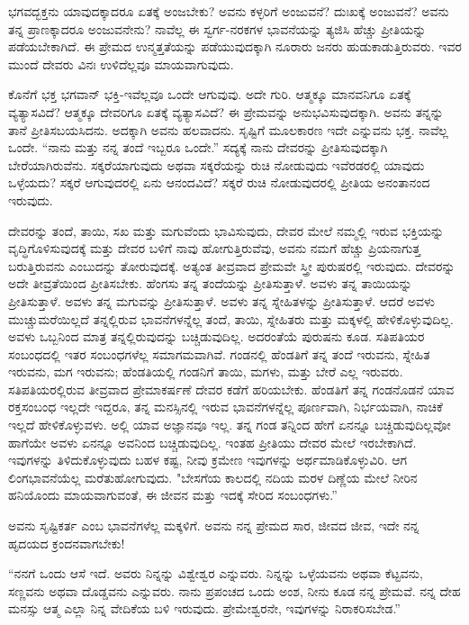 ಭಗವದ್ಭಕ್ತನು ಯಾವುದಕ್ಕಾದರೂ ಏತಕ್ಕೆ ಅಂಜಬೇಕು? ಅವನು ಕಳ್ಳರಿಗೆ ಅಂಜುವನೆ? ದುಃಖಕ್ಕೆ ಅಂಜುವನೆ? ಅವನು ತನ್ನ ಪ್ರಾಣಕ್ಕಾದರೂ ಅಂಜುವನೇನು? ನಾವೆಲ್ಲ ಈ ಸ್ವರ್ಗ-ನರಕಗಳ ಭಾವನೆಯನ್ನು ತ್ಯಜಿಸಿ ಹೆಚ್ಚು ಪ್ರೀತಿಯನ್ನು ಪಡೆಯಬೇಕಾಗಿದೆ. ಈ ಪ್ರೇಮದ ಉನ್ಮತ್ತತೆಯನ್ನು ಪಡೆಯುವುದಕ್ಕಾಗಿ ನೂರಾರು ಜನರು ಹುಡುಕಾಡುತ್ತಿರುವರು. ಇವರ ಮುಂದೆ ದೇವರು ವಿನಃ ಉಳಿದೆಲ್ಲವೂ ಮಾಯವಾಗುವುದು.

ಕೊನೆಗೆ ಭಕ್ತ ಭಗವಾನ್ ಭಕ್ತಿ-ಇವೆಲ್ಲವೂ ಒಂದೇ ಆಗುವುವು. ಅದೇ ಗುರಿ. ಆತ್ಮಕ್ಕೂ ಮಾನವನಿಗೂ ಏತಕ್ಕೆ ವ್ಯತ್ಯಾಸವಿದೆ? ಆತ್ಮಕ್ಕೂ ದೇವರಿಗೂ ಏತಕ್ಕೆ ವ್ಯತ್ಯಾಸವಿದೆ? ಈ ಪ್ರೇಮವನ್ನು ಅನುಭವಿಸುವುದಕ್ಕಾಗಿ. ಅವನು ತನ್ನನ್ನು ತಾನೆ ಪ್ರೀತಿಸಬಯಸಿದನು. ಅದಕ್ಕಾಗಿ ಅವನು ಹಲವಾದನು. ಸೃಷ್ಟಿಗೆ ಮೂಲಕಾರಣ ಇದೇ ಎನ್ನುವನು ಭಕ್ತ. ನಾವೆಲ್ಲ ಒಂದೇ. “ನಾನು ಮತ್ತು ನನ್ನ ತಂದೆ ಇಬ್ಬರೂ ಒಂದೇ.” ಸದ್ಯಕ್ಕೆ ನಾನು ದೇವರನ್ನು ಪ್ರೀತಿಸುವುದಕ್ಕಾಗಿ ಬೇರೆಯಾಗಿರುವೆನು. ಸಕ್ಕರೆಯಾಗುವುದು ಅಥವಾ ಸಕ್ಕರೆಯನ್ನು ರುಚಿ ನೋಡುವುದು ಇವೆರಡರಲ್ಲಿ ಯಾವುದು ಒಳ್ಳೆಯದು? ಸಕ್ಕರೆ ಆಗುವುದರಲ್ಲಿ ಏನು ಆನಂದವಿದೆ? ಸಕ್ಕರೆ ರುಚಿ ನೋಡುವುದರಲ್ಲಿ ಪ್ರೀತಿಯ ಅನಂತಾನಂದ ಇರುವುದು.

ದೇವರನ್ನು ತಂದೆ, ತಾಯಿ, ಸಖ ಮತ್ತು ಮಗುವೆಂದು ಭಾವಿಸುವುದು, ದೇವರ ಮೇಲೆ ನಮ್ಮಲ್ಲಿ ಇರುವ ಭಕ್ತಿಯನ್ನು ವೃದ್ಧಿಗೊಳಿಸುವುದಕ್ಕೆ ಮತ್ತು ದೇವರ ಬಳಿಗೆ ನಾವು ಹೋಗುತ್ತಿರುವೆವು, ಅವನು ನಮಗೆ ಹೆಚ್ಚು ಪ್ರಿಯನಾಗುತ್ತ ಬರುತ್ತಿರುವನು ಎಂಬುದನ್ನು ತೋರುವುದಕ್ಕೆ. ಅತ್ಯಂತ ತೀವ್ರವಾದ ಪ್ರೇಮವೇ ಸ್ತ್ರೀ ಪುರುಷರಲ್ಲಿ ಇರುವುದು. ದೇವರನ್ನು ಅದೇ ತೀವ್ರತೆಯಿಂದ ಪ್ರೀತಿಸಬೇಕು. ಹೆಂಗಸು ತನ್ನ ತಂದೆಯನ್ನು ಪ್ರೀತಿಸುತ್ತಾಳೆ. ಅವಳು ತನ್ನ ತಾಯಿಯನ್ನು ಪ್ರೀತಿಸುತ್ತಾಳೆ. ಅವಳು ತನ್ನ ಮಗುವನ್ನು ಪ್ರೀತಿಸುತ್ತಾಳೆ. ಅವಳು ತನ್ನ ಸ್ನೇಹಿತಳನ್ನು ಪ್ರೀತಿಸುತ್ತಾಳೆ. ಆದರೆ ಅವಳು ಮುಚ್ಚುಮರೆಯಿಲ್ಲದೆ ತನ್ನಲ್ಲಿರುವ ಭಾವನೆಗಳನ್ನೆಲ್ಲ ತಂದೆ, ತಾಯಿ, ಸ್ನೇಹಿತರು ಮತ್ತು ಮಕ್ಕಳಲ್ಲಿ ಹೇಳಿಕೊಳ್ಳುವುದಿಲ್ಲ. ಅವಳು ಒಬ್ಬನಿಂದ ಮಾತ್ರ ತನ್ನಲ್ಲಿರುವುದನ್ನು ಬಚ್ಚಿಡುವುದಿಲ್ಲ. ಅದರಂತೆಯೆ ಪುರುಷನು ಕೂಡ. ಸತಿಪತಿಯರ ಸಂಬಂಧದಲ್ಲಿ ಇತರ ಸಂಬಂಧಗಳೆಲ್ಲ ಸಮಾಗಮವಾಗಿವೆ. ಗಂಡನಲ್ಲಿ ಹೆಂಡತಿಗೆ ತನ್ನ ತಂದೆ ಇರುವನು, ಸ್ನೇಹಿತ ಇರುವನು, ಮಗ ಇರುವನು; ಹೆಂಡತಿಯಲ್ಲಿ ಗಂಡನಿಗೆ ತಾಯಿ, ಮಗಳು, ಮತ್ತು ಬೇರೆ ಎಲ್ಲ ಇರುವರು. ಸತಿಪತಿಯರಲ್ಲಿರುವ ತೀವ್ರವಾದ ಪ್ರೇಮಾಕರ್ಷಣೆ ದೇವರ ಕಡೆಗೆ ಹರಿಯಬೇಕು. ಹೆಂಡತಿಗೆ ತನ್ನ ಗಂಡನೊಡನೆ ಯಾವ ರಕ್ತಸಂಬಂಧ ಇಲ್ಲದೇ ಇದ್ದರೂ, ತನ್ನ ಮನಸ್ಸಿನಲ್ಲಿ ಇರುವ ಭಾವನೆಗಳನ್ನೆಲ್ಲ ಪೂರ್ಣವಾಗಿ, ನಿರ್ಭಯವಾಗಿ, ನಾಚಿಕೆ ಇಲ್ಲದೆ ಹೇಳಿಕೊಳ್ಳುವಳು. ಅಲ್ಲಿ ಯಾವ ಅಜ್ಞಾನವೂ ಇಲ್ಲ. ತನ್ನ ಗಂಡ ತನ್ನಿಂದ ಹೇಗೆ ಏನನ್ನೂ ಬಚ್ಚಿಡುವುದಿಲ್ಲವೋ ಹಾಗೆಯೇ ಅವಳು ಏನನ್ನೂ ಅವನಿಂದ ಬಚ್ಚಿಡುವುದಿಲ್ಲ. ಇಂತಹ ಪ್ರೀತಿಯು ದೇವರ ಮೇಲೆ ಇರಬೇಕಾಗಿದೆ. ಇವುಗಳನ್ನು ತಿಳಿದುಕೊಳ್ಳುವುದು ಬಹಳ ಕಷ್ಟ, ನೀವು ಕ್ರಮೇಣ ಇವುಗಳನ್ನು ಅರ್ಥಮಾಡಿಕೊಳ್ಳುವಿರಿ. ಆಗ ಲಿಂಗಭಾವನೆಯೆಲ್ಲ ಮರೆತುಹೋಗುವುದು. "ಬೇಸಗೆಯ ಕಾಲದಲ್ಲಿ ನದಿಯ ಮರಳ ದಿಣ್ಣೆಯ ಮೇಲೆ ನೀರಿನ ಹನಿಯೊಂದು ಮಾಯವಾಗುವಂತೆ, ಈ ಜೀವನ ಮತ್ತು ಇದಕ್ಕೆ ಸೇರಿದ ಸಂಬಂಧಗಳು.”

ಅವನು ಸೃಷ್ಟಿಕರ್ತ ಎಂಬ ಭಾವನೆಗಳೆಲ್ಲ ಮಕ್ಕಳಿಗೆ. ಅವನು ನನ್ನ ಪ್ರೇಮದ ಸಾರ, ಜೀವದ ಜೀವ, ಇದೇ ನನ್ನ ಹೃದಯದ ಕ್ರಂದನವಾಗಬೇಕು!

“ನನಗೆ ಒಂದು ಆಸೆ ಇದೆ. ಅವರು ನಿನ್ನನ್ನು ವಿಶ್ವೇಶ್ವರ ಎನ್ನುವರು. ನಿನ್ನನ್ನು ಒಳ್ಳೆಯವನು ಅಥವಾ ಕೆಟ್ಟವನು, ಸಣ್ಣವನು ಅಥವಾ ದೊಡ್ಡವನು ಎನ್ನುವರು. ನಾನು ಪ್ರಪಂಚದ ಒಂದು ಅಂಶ, ನೀನು ಕೂಡ ನನ್ನ ಪ್ರೇಮವೆ. ನನ್ನ ದೇಹ ಮನಸ್ಸು ಆತ್ಮ ಎಲ್ಲಾ ನಿನ್ನ ವೇದಿಕೆಯ ಬಳಿ ಇರುವುದು. ಪ್ರೇಮೇಶ್ವರನೇ, ಇವುಗಳನ್ನು ನಿರಾಕರಿಸಬೇಡ.''


